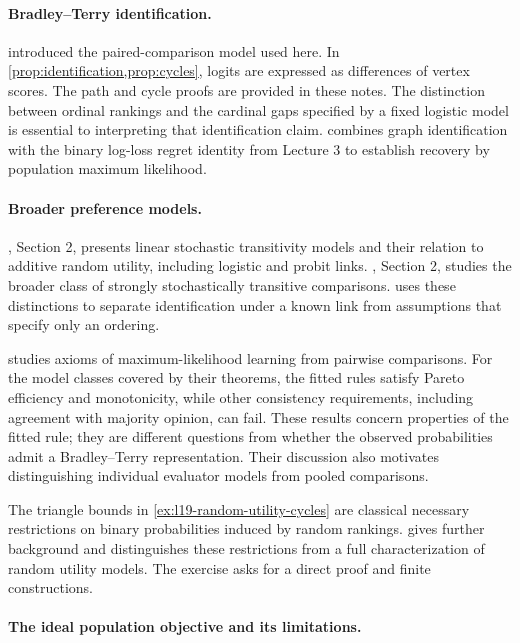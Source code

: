 \documentclass[11pt,twoside]{article}
\theoremstyle{definition}
\theoremstyle{remark}
\begin{document}
\paragraph{Bradley--Terry identification.}

\citet{bradley1952} introduced the paired-comparison model used here.
In \cref{prop:identification,prop:cycles}, logits are expressed as differences
of vertex scores. The path and cycle
proofs are provided in these notes. The distinction between ordinal rankings
and the cardinal gaps specified by a fixed logistic model is essential
to interpreting that identification claim.
 combines graph identification with the
binary log-loss regret identity from Lecture 3 to establish recovery by
population maximum likelihood.

\paragraph{Broader preference models.}
\citet{bengs2022}, Section 2, presents linear stochastic transitivity
models and their relation to additive random utility, including logistic
and probit links. \citet{shah2016}, Section 2, studies the broader class
of strongly stochastically transitive comparisons. 
uses these distinctions to separate identification under a known link
from assumptions that specify only an ordering.

\citet{noothigattu2020} studies axioms of maximum-likelihood learning from
pairwise comparisons. For the model classes covered by their theorems,
the fitted rules satisfy Pareto efficiency and monotonicity, while other
consistency requirements, including agreement with majority opinion, can
fail. These results concern properties of the fitted rule; they are
different questions from whether the observed probabilities admit a
Bradley--Terry representation. Their discussion also motivates distinguishing
individual evaluator models from pooled comparisons.

The triangle bounds in \cref{ex:l19-random-utility-cycles} are classical
necessary restrictions on binary probabilities induced by random rankings.
\citet{sprumont2022} gives further background and distinguishes these
restrictions from a full characterization of random utility models.
The exercise asks for a direct proof and finite constructions.

\paragraph{The ideal population objective and its limitations.}
\end{document}

